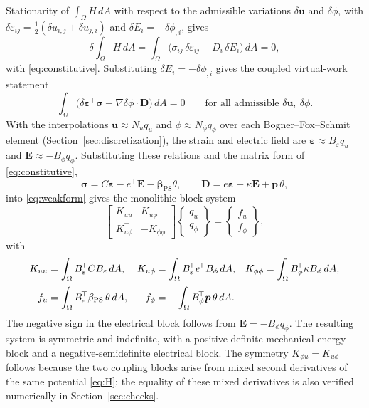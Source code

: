 \documentclass[a4paper, 11pt, twoside]{article}
\begin{document}
Stationarity of $\int_\Omega H\,dA$ with respect to the admissible variations
$\delta\bm u$ and $\delta\phi$, with
$\delta\varepsilon_{ij}=\tfrac12(\delta u_{i,j}+\delta u_{j,i})$ and
$\delta E_i=-\delta\phi_{,i}$, gives
\begin{equation}
\delta\!\int_\Omega H\,dA
=\int_\Omega\big(\sigma_{ij}\,\delta\varepsilon_{ij}
-D_i\,\delta E_i\big)\,dA=0,
\label{eq:stationarity}
\end{equation}
with \eqref{eq:constitutive}. Substituting
$\delta E_i=-\delta\phi_{,i}$ gives the coupled virtual-work statement
\begin{equation}
\int_\Omega\big(\delta\bm\varepsilon^{\!\top}\bm\sigma
+\nabla\delta\phi\cdot\bm D\big)\,dA=0
\qquad\text{for all admissible }\delta\bm u,\ \delta\phi.
\label{eq:weakform}
\end{equation}
With the interpolations $\bm u\approx N_uq_u$ and
$\phi\approx N_\phi q_\phi$ over each Bogner--Fox--Schmit element
(Section~\ref{sec:discretization}), the strain and electric field are
$\bm\varepsilon\approx B_\varepsilon q_u$ and
$\bm E\approx-B_\phi q_\phi$. Substituting these relations and the matrix form of
\eqref{eq:constitutive},
\[
\bm\sigma=C\bm\varepsilon-e^{\!\top}\bm E
-\bm\beta_{\mathrm{PS}}\theta,
\qquad
\bm D=e\bm\varepsilon+\kappa\bm E+\bm p\,\theta,
\]
into \eqref{eq:weakform} gives the monolithic block system
\begin{equation}
\begin{bmatrix}
K_{uu} & K_{u\phi}\\
K_{u\phi}^{\!\top} & -K_{\phi\phi}
\end{bmatrix}
\begin{Bmatrix}q_u\\q_\phi\end{Bmatrix}
=
\begin{Bmatrix}f_u\\f_\phi\end{Bmatrix},
\label{eq:global}
\end{equation}
with
\begin{align}
K_{uu}&=\int_\Omega B_\varepsilon^{\!\top}CB_\varepsilon\,dA, &
K_{u\phi}&=\int_\Omega B_\varepsilon^{\!\top}e^{\!\top}B_\phi\,dA, &
K_{\phi\phi}&=\int_\Omega B_\phi^{\!\top}\kappa B_\phi\,dA,\notag\\[2pt]
f_u&=\int_\Omega B_\varepsilon^{\!\top}\beta_{\mathrm{PS}}\,\theta\,dA, &
f_\phi&=-\int_\Omega B_\phi^{\!\top}\bm p\,\theta\,dA.& &
\label{eq:elementmats}
\end{align}
The negative sign in the electrical block follows from
$\bm E=-B_\phi q_\phi$. The resulting system is symmetric and indefinite, with a
positive-definite mechanical energy block and a negative-semidefinite electrical
block. The symmetry
$K_{\phi u}=K_{u\phi}^{\!\top}$ follows because the two coupling blocks arise from
mixed second derivatives of the same potential \eqref{eq:H}; the equality of these
mixed derivatives is also verified numerically in Section~\ref{sec:checks}.
\end{document}
